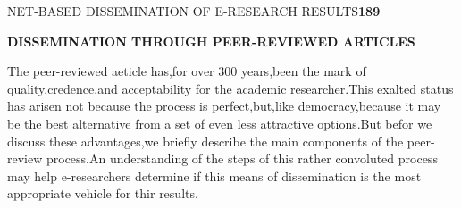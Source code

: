 \documentclass[10pt,a4paper]{article}
\begin{document}
\small

\begin{flushright}
NET-BASED DISSEMINATION OF E-RESEARCH RESULTS\quad \textbf{189}
\end{flushright}

\begin{flushleft}
\normalsize
\textbf{DISSEMINATION THROUGH PEER-REVIEWED ARTICLES}
\end{flushleft}

The peer-reviewed aeticle has,for over 300 years,been the mark of quality,credence,and acceptability for the academic researcher.This exalted status has arisen not because the process is perfect,but,like democracy,because it may be the best alternative from a set of even less attractive options.But befor we discuss these advantages,we briefly describe the main components of the peer-review process.An understanding of the steps of this rather convoluted process may help e-researchers determine if this means of dissemination is the most appropriate vehicle for thir results.
\end{document}
